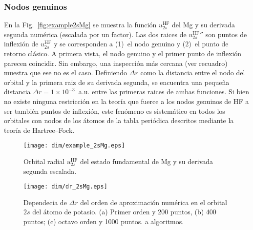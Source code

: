 \subsubsection*{Nodos genuinos}

En la Fig.~\ref{fig:example2sMg} se muestra la función 
$u_{2s}^{\mathrm{HF}}$ del Mg y su derivada segunda numérica (escalada 
por un factor). Las dos raices de $u_{2s}^{\mathrm{HF}}''$ son puntos de 
inflexión de $u_{2s}^{\mathrm{HF}}$ y se corresponden a (1)~el nodo 
genuino y (2)~el punto de retorno clásico. A primera vista, el nodo 
genuino y el primer punto de inflexión parecen coincidir. Sin embargo, 
una inspección más cercana (ver recuadro) muestra que ese no es el caso. 
Definiendo $\Delta r$ como la distancia entre el nodo del orbital y la 
primera raiz de su derivada segunda, se encuentra una pequeña distancia 
$\Delta r=1\times 10^{-3}$~a.u. entre las primeras raices de ambas 
funciones. Si bien no existe ninguna restricción en la teoría que fuerce 
a los nodos genuinos de HF a ser también puntos de inflexión, este 
fenómeno es sistemático en todos los orbitales con nodos de los átomos 
de la tabla periódica descritos mediante la teoría de Hartree--Fock. 

\begin{figure}
\vspace{-0.4cm}
\centering
\texttt{[image: dim/example\_2sMg.eps]} 
\vspace{-0.45cm}
\caption[Orbital radial y su derivada segunda.]
{Orbital radial $u_{2s}^{\mathrm{HF}}$ del estado fundamental de Mg y su 
derivada segunda escalada.}
\label{fig:example2sMg}

\vspace{0.4cm}
\texttt{[image: dim/dr\_2sMg.eps]} 
\vspace{-0.45cm}
\caption[Dependecia de $\Delta r$ del orden de aproximación numérica.]
{Dependecia de $\Delta r$ del orden de aproximación numérica en el 
orbital $2s$ del átomo de potasio. (a) Primer orden y 200 puntos, (b) 
400 puntos; (c) octavo orden y 1000 puntos.
a algoritmos.}
\label{fig:dr2sMg}
\end{figure}

